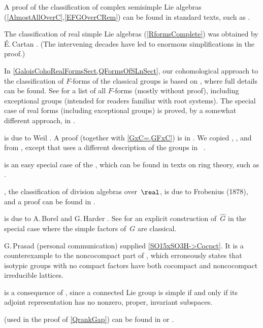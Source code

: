 \begin{notes}

A proof of the classification of complex semisimple Lie algebras (\ref{AlmostAllOverC},\ref{EFGOverCRem}) can be found in standard texts, such as \cite[Thm.~11.4, pp.~57--58, and Thm.~18.4, p.~101]{Humphreys-LieAlg}.

The classification of real simple Lie algebras
(\cref{RformsComplete}) was
obtained by \'E.\,Cartan \cite{Cartan-RSimple}. (The
intervening decades have led to enormous simplifications in
the proof.) 

In \cref{GaloisCohoRealFormsSect,QFormsOfSLnSect}, our cohomological approach to the classification of $F$-forms of the classical groups is based on \cite[\S2.3]{PlatonovRapinchukBook}, where full details can be found. See \cite{Tits-Classification} for a list of all $F$-forms (mostly without proof), including exceptional groups (intended for readers familiar with root systems). The special case of real forms (including exceptional groups) is proved, by a somewhat different approach, in \cite[Chap.~10]{HelgasonBook}. 

 is due to Weil \cite{Weil-Classical}. 
A proof (together with
\cref{GxC=,GFxC}) is in \cite[\S2.3,
pp.~78--92]{PlatonovRapinchukBook}. We copied ,
, and~ from
\cite[p.~92]{PlatonovRapinchukBook}, except that
\cite{PlatonovRapinchukBook} uses a different description of
the groups in~
.

 is an easy special case of the , which can be found in texts on ring theory, such as \cite[\S12.6, p.~230]{Pierce-AssocAlgs}.

, the classification of division algebras over~$\real$, is due to Frobenius (1878), and a proof can be found in \cite[pp.~452--453]{Jacobson-BasicAlgebra1}. 

 is due to A.\,Borel and G.\,Harder \cite{BorelHarder-exist}.
See \cite{Johnson-isotypic} for an explicit construction of~$\widehat G$ in the special case where the simple factors of~$G$ are classical.

G.\,Prasad (personal communication) supplied \cref{SO15xSO3H->Cocpct}. It is a counterexample to the noncocompact part of \cite[Thm.~C]{Johnson-isotypic}, which erroneously states that isotypic groups with no compact factors have both cocompact and noncocompact irreducible lattices.

 is a consequence of \cite[Prop.~1 of App.~2, p.~385]{Bourbaki-LieGrpsLieAlgs2}, since a connected Lie group is simple if and only if its adjoint representation has no nonzero, proper, invariant subspaces. 

 (used in
the proof of \cref{QrankGap}) can be found in
\cite[Thm.~1 of \S1.7 and Thm.~5 of \S1.6, pp.~61
and~51]{BorevichShafarevich} or \cite[Cor.~2 of \S4.3.2,
p.~43]{Serre-CourseArith}.

\end{notes}



